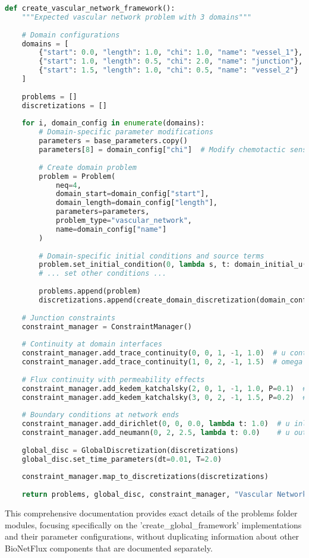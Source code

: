 \begin{lstlisting}[language=Python, caption=Expected Multi-Domain Problem Template]
def create_vascular_network_framework():
    """Expected vascular network problem with 3 domains"""
    
    # Domain configurations
    domains = [
        {"start": 0.0, "length": 1.0, "chi": 1.0, "name": "vessel_1"},
        {"start": 1.0, "length": 0.5, "chi": 2.0, "name": "junction"},  
        {"start": 1.5, "length": 1.0, "chi": 0.5, "name": "vessel_2"}
    ]
    
    problems = []
    discretizations = []
    
    for i, domain_config in enumerate(domains):
        # Domain-specific parameter modifications
        parameters = base_parameters.copy()
        parameters[8] = domain_config["chi"]  # Modify chemotactic sensitivity
        
        # Create domain problem
        problem = Problem(
            neq=4,
            domain_start=domain_config["start"],
            domain_length=domain_config["length"],
            parameters=parameters,
            problem_type="vascular_network",
            name=domain_config["name"]
        )
        
        # Domain-specific initial conditions and source terms
        problem.set_initial_condition(0, lambda s, t: domain_initial_u(s, t, i))
        # ... set other conditions ...
        
        problems.append(problem)
        discretizations.append(create_domain_discretization(domain_config))
    
    # Junction constraints
    constraint_manager = ConstraintManager()
    
    # Continuity at domain interfaces
    constraint_manager.add_trace_continuity(0, 0, 1, -1, 1.0)  # u continuity
    constraint_manager.add_trace_continuity(1, 0, 2, -1, 1.5)  # omega continuity
    
    # Flux continuity with permeability effects
    constraint_manager.add_kedem_katchalsky(2, 0, 1, -1, 1.0, P=0.1)  # v coupling
    constraint_manager.add_kedem_katchalsky(3, 0, 2, -1, 1.5, P=0.2)  # phi coupling
    
    # Boundary conditions at network ends
    constraint_manager.add_dirichlet(0, 0, 0.0, lambda t: 1.0)  # u inlet
    constraint_manager.add_neumann(0, 2, 2.5, lambda t: 0.0)    # u outlet
    
    global_disc = GlobalDiscretization(discretizations)
    global_disc.set_time_parameters(dt=0.01, T=2.0)
    
    constraint_manager.map_to_discretizations(discretizations)
    
    return problems, global_disc, constraint_manager, "Vascular Network Model"
\end{lstlisting}

This comprehensive documentation provides exact details of the problems folder modules, focusing specifically on the 'create\_global\_framework' implementations and their parameter configurations, without duplicating information about other BioNetFlux components that are documented separately.

